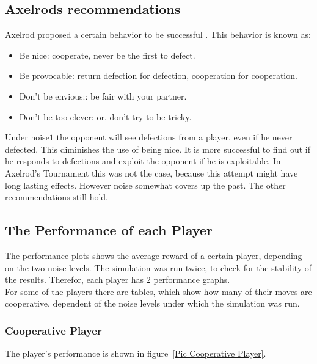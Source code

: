 \subsection{Axelrods recommendations}
Axelrod proposed a certain behavior to be successful \cite{axelrod}. This behavior is known as:
\begin{itemize}
 \item     Be nice: cooperate, never be the first to defect.\\[-6mm]
 \item Be provocable: return defection for defection, cooperation for cooperation.\\[-6mm]
\item Don't be envious:: be fair with your partner.\\[-6mm]
\item  Don't be too clever: or, don't try to be tricky.\cite{recon}
\end{itemize}

Under noise$1$ the opponent will see defections from a player, even if he never defected. This diminishes the use of being nice. It is more successful to find out if he responds to defections and exploit the opponent if he is exploitable. In Axelrod's Tournament this was not the case, because this attempt might have long lasting effects. However noise somewhat covers up the past. The other recommendations still hold.

\subsection{The Performance of each Player}

The performance plots shows the average reward of a certain player, depending on the two noise levels. The simulation was run twice, to check for the stability of the results. Therefor, each player has $2$ performance graphs.\\

For some of the players there are tables, which show how many of their moves are cooperative, dependent of the noise levels under which the simulation was run. 

\subsubsection{Cooperative Player}

The player's performance is shown in figure~\ref{Pic Cooperative Player}.\\

